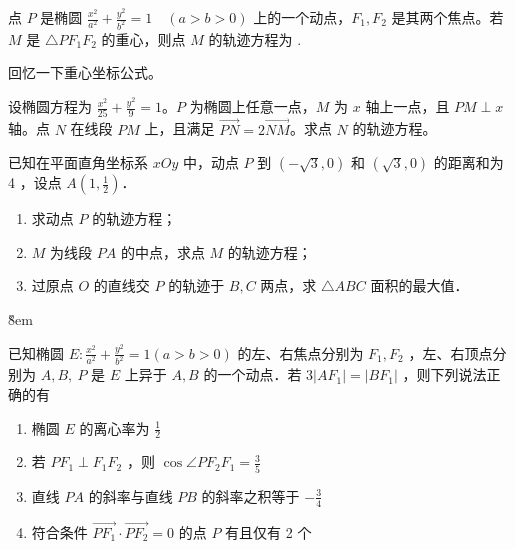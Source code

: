 \newpage{}

\begin{example}
    点 $P$ 是椭圆 $\frac{x^2}{a^2} + \frac{y^2}{b^2} = 1 \quad (a>b>0)$ 上的一个动点，$F_1, F_2$ 是其两个焦点。若 $M$ 是 $\triangle PF_1F_2$ 的重心，则点 $M$ 的轨迹方程为 \underline{\hspace{4cm}}.
\end{example}

\begin{tips}
    回忆一下重心坐标公式。
\end{tips}

\vspace{6em}

\begin{example}
    设椭圆方程为 $\frac{x^2}{25} + \frac{y^2}{9} = 1$。$P$ 为椭圆上任意一点，$M$ 为 $x$ 轴上一点，且 $PM \perp x$ 轴。点 $N$ 在线段 $PM$ 上，且满足 $\overrightarrow{PN} = 2\overrightarrow{NM}$。求点 $N$ 的轨迹方程。
\end{example}

\vspace{6em}



\begin{problem}
已知在平面直角坐标系 $x O y$ 中，动点 $P$ 到 $(-\sqrt{3}, 0)$ 和 $(\sqrt{3}, 0)$ 的距离和为 4 ，设点 $A\left(1, \frac{1}{2}\right)$．
\begin{enumerate}
    \item 求动点 $P$ 的轨迹方程；
    \item $M$ 为线段 $P A$ 的中点，求点 $M$ 的轨迹方程；
    \item 过原点 $O$ 的直线交 $P$ 的轨迹于 $B, C$ 两点，求 $\triangle A B C$ 面积的最大值．
\end{enumerate}
\end{problem}

\v{8em}

\begin{problem}
已知椭圆 $E: \frac{x^2}{a^2}+\frac{y^2}{b^2}=1(a>b>0)$ 的左、右焦点分别为 $F_1, F_2$ ，左、右顶点分别为 $A, B, ~ P$ 是 $E$ 上异于 $A, B$ 的一个动点．若 $3\left|A F_1\right|=\left|B F_1\right|$ ，则下列说法正确的有
\begin{enumerate}
    \item 椭圆 $E$ 的离心率为 $\frac{1}{2}$
    \item 若 $P F_1 \perp F_1 F_2$ ，则 $\cos \angle P F_2 F_1=\frac{3}{5}$
    \item 直线 $P A$ 的斜率与直线 $P B$ 的斜率之积等于 $-\frac{3}{4}$
    \item 符合条件 $\overrightarrow{P F_1} \cdot \overrightarrow{P F_2}=0$ 的点 $P$ 有且仅有 2 个
\end{enumerate}
\end{problem}

